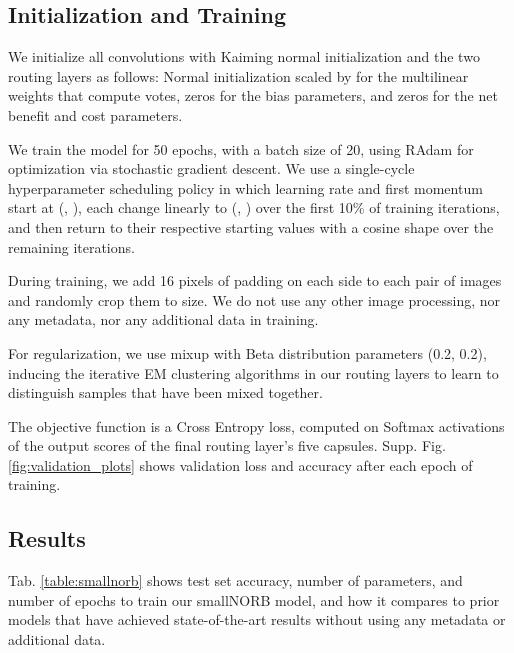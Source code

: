 \documentclass[11pt,a4paper]{article}
\begin{document}
\subsection{Initialization and Training}

We initialize all convolutions with Kaiming normal initialization \cite{DBLP:journals/corr/HeZR015} and the two routing layers as follows: Normal initialization scaled by  for the multilinear weights that compute votes, zeros for the bias parameters, and zeros for the net benefit and cost parameters.

We train the model for 50 epochs, with a batch size of 20, using RAdam \cite{liu2019variance} for optimization via stochastic gradient descent. We use a single-cycle hyperparameter scheduling policy in which learning rate  and first momentum  start at (, ), each change linearly to (, ) over the first 10\% of training iterations, and then return to their respective starting values with a cosine shape over the remaining iterations.

During training, we add 16 pixels of padding on each side to each pair of images and randomly crop them to  size. We do not use any other image processing, nor any metadata, nor any additional data in training.

For regularization, we use mixup \cite{DBLP:journals/corr/abs-1710-09412} with Beta distribution parameters (0.2, 0.2), inducing the iterative EM clustering algorithms in our routing layers to learn to distinguish samples that have been mixed together.

The objective function is a Cross Entropy loss, computed on Softmax activations of the output scores of the final routing layer's five capsules. Supp. Fig. \ref{fig:validation_plots} shows validation loss and accuracy after each epoch of training.

\subsection{Results}

Tab. \ref{table:smallnorb} shows test set accuracy, number of parameters, and number of epochs to train our smallNORB model, and how it compares to prior models that have achieved state-of-the-art results without using any metadata or additional data.
\end{document}
